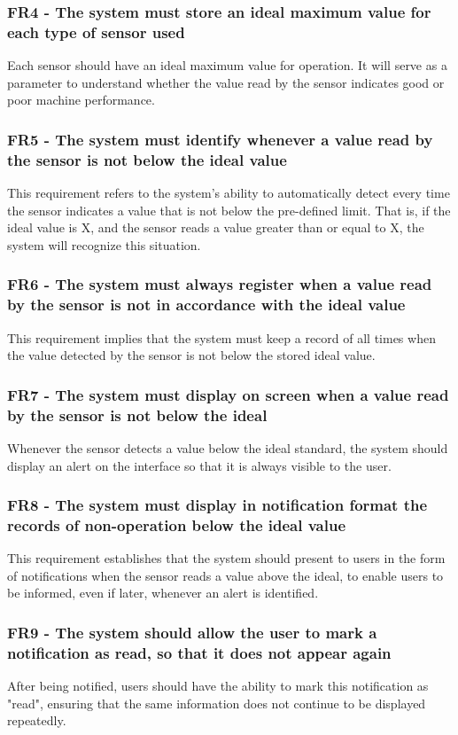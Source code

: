 \subsubsection{FR4 - The system must store an ideal maximum value for each type of sensor used}
Each sensor should have an ideal maximum value for operation. It will serve as a parameter to understand whether the value read by the sensor indicates good or poor machine performance.

\subsubsection{FR5 - The system must identify whenever a value read by the sensor is not below the ideal value}
This requirement refers to the system's ability to automatically detect every time the sensor indicates a value that is not below the pre-defined limit. That is, if the ideal value is X, and the sensor reads a value greater than or equal to X, the system will recognize this situation.

\subsubsection{FR6 - The system must always register when a value read by the sensor is not in accordance with the ideal value}
This requirement implies that the system must keep a record of all times when the value detected by the sensor is not below the stored ideal value.

\subsubsection{FR7 - The system must display on screen when a value read by the sensor is not below the ideal}
Whenever the sensor detects a value below the ideal standard, the system should display an alert on the interface so that it is always visible to the user.

\subsubsection{FR8 - The system must display in notification format the records of non-operation below the ideal value}This requirement establishes that the system should present to users in the form of notifications when the sensor reads a value above the ideal, to enable users to be informed, even if later, whenever an alert is identified.

\subsubsection{FR9 - The system should allow the user to mark a notification as read, so that it does not appear again}
After being notified, users should have the ability to mark this notification as "read", ensuring that the same information does not continue to be displayed repeatedly.

